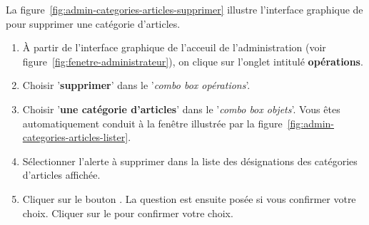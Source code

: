 La figure~\ref{fig:admin-categories-articles-supprimer} illustre
l'interface graphique de \yeroth pour supprimer une
cat\'egorie d'articles.

\begin{enumerate}[1)]
	\item \`A partir de l'interface graphique de l'acceuil de
		l'administration (voir figure~\ref{fig:fenetre-administrateur}),
		on clique sur l'onglet intitul\'e \textbf{op\'erations}. 
		
	\item Choisir '\textbf{supprimer}' dans le '\emph{combo box
		op\'erations}'.
		
	\item Choisir '\textbf{une cat\'egorie d'articles}' dans le
		'\emph{combo box objets}'. Vous \^etes automatiquement
		conduit \`a la fen\^etre illustr\'ee par la
		figure~\ref{fig:admin-categories-articles-lister}.
		
	\item S\'electionner l'alerte \`a supprimer dans la liste
		des d\'esignations des cat\'egories d'articles affich\'ee.
		
	\item Cliquer sur le bouton . La question
		est ensuite pos\'ee si vous confirmer votre choix.
		Cliquer sur le  pour confirmer votre choix.
\end{enumerate}
